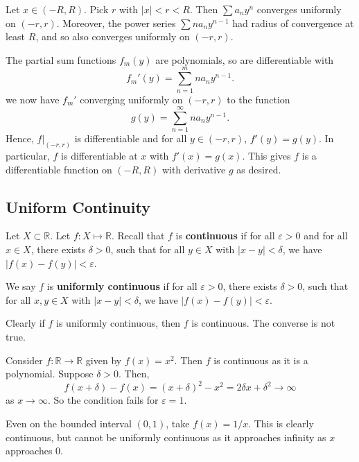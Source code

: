 \documentclass[12pt]{article}
\begin{document}
\begin{proofbox}
	Let $x \in (-R, R)$. Pick $r$ with $|x| < r < R$. Then $\sum a_n y^{n}$ converges uniformly on $(-r, r)$. Moreover, the power series $\sum n a_n y^{n-1}$ had radius of convergence at least $R$, and so also converges uniformly on $(-r, r)$.

	The partial sum functions $f_m(y)$ are polynomials, so are differentiable with
	\[
		f_m'(y) = \sum_{n = 1}^{m} n a_n y^{n-1}
	.\]
	we now have $f_m'$ converging uniformly on $(-r, r)$ to the function
	\[
		g(y) = \sum_{n = 1}^{\infty}n a_n y^{n-1}
	.\]
	Hence, $f|_{(-r, r)}$ is differentiable and for all $y \in (-r, r)$, $f'(y) = g(y)$. In particular, $f$ is differentiable at $x$ with $f'(x) = g(x)$. This gives $f$ is a differentiable function on $(-R, R)$ with derivative $g$ as desired.
\end{proofbox}

\subsection{Uniform Continuity}%
\label{sub:uniform_continuity}

Let $X \subset \mathbb{R}$. Let $f : X \mapsto \mathbb{R}$. Recall that $f$ is \textbf{continuous} if for all $\varepsilon > 0$ and for all $x \in X$, there exists $\delta > 0$, such that for all $y \in X$ with $|x - y| < \delta$, we have $|f(x) - f(y)| < \varepsilon$.

\begin{definition}
	We say $f$ is \textbf{uniformly continuous} if for all $\varepsilon > 0$, there exists $\delta > 0$, such that for all $x, y \in X$ with $|x - y| < \delta$, we have $|f(x) - f(y)| < \varepsilon$.
\end{definition}

\begin{remark}
	Clearly if $f$ is uniformly continuous, then $f$ is continuous. The converse is not true.
\end{remark}

\begin{exbox}
	Consider $f : \mathbb{R} \to \mathbb{R}$ given by $f(x) = x^2$. Then $f$ is continuous as it is a polynomial. Suppose $\delta > 0$. Then,
	\[
		f(x + \delta) - f(x) = (x + \delta)^2 - x^2 = 2 \delta x + \delta^2 \to \infty
	\]
	as $x \to \infty$. So the condition fails for $\varepsilon = 1$.

	Even on the bounded interval $(0, 1)$, take $f(x) = 1/x$. This is clearly continuous, but cannot be uniformly continuous as it approaches infinity as $x$ approaches 0.
\end{exbox}
\end{document}

